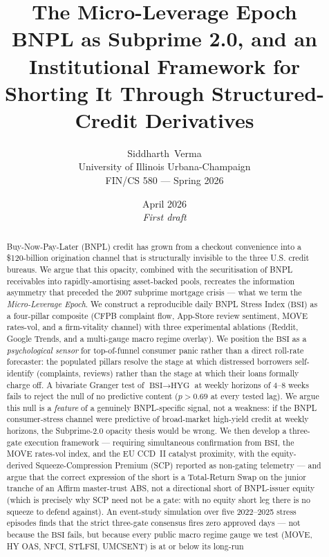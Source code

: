 \documentclass[11pt,letterpaper]{article}
\title{\vspace{-2em}
\Huge\bfseries The Micro-Leverage Epoch \\[0.2em]
\Large BNPL as Subprime 2.0, and an Institutional Framework for Shorting
It Through Structured-Credit Derivatives}
\author{
Siddharth~Verma \\[0.3em]
\small University of Illinois Urbana-Champaign \\
\small FIN/CS 580 --- Spring 2026}
\date{April 2026 \\ \small\textit{First draft}}
\newcommand{\bsi}{\text{BSI}}
\begin{document}
\maketitle
\thispagestyle{empty}

\begin{abstract}
\noindent
Buy-Now-Pay-Later (BNPL) credit has grown from a checkout convenience into a
\$120-billion origination channel that is structurally invisible to the three
U.S. credit bureaus. We argue that this opacity, combined with the securitisation
of BNPL receivables into rapidly-amortising asset-backed pools, recreates the
information asymmetry that preceded the 2007 subprime mortgage crisis --- what
we term the \emph{Micro-Leverage Epoch}. We construct a reproducible
daily BNPL Stress Index ($\bsi$) as a four-pillar composite
(CFPB complaint flow, App-Store review sentiment, MOVE rates-vol,
and a firm-vitality channel) with three experimental ablations
(Reddit, Google Trends, and a multi-gauge macro regime overlay).
We position the $\bsi$ as a \emph{psychological sensor} for
top-of-funnel consumer panic rather than a direct roll-rate
forecaster: the populated pillars resolve the stage at which
distressed borrowers self-identify (complaints, reviews) rather
than the stage at which their loans formally charge off.
A bivariate Granger test of $\bsi \rightarrow \text{HYG}$ at
weekly horizons of 4--8 weeks fails to reject the null of no
predictive content ($p > 0.69$ at every tested lag). We argue
this null is a \emph{feature} of a genuinely BNPL-specific
signal, not a weakness: if the BNPL consumer-stress channel were
predictive of broad-market high-yield credit at weekly horizons,
the Subprime-2.0 opacity thesis would be wrong. We then develop a
three-gate execution framework --- requiring simultaneous
confirmation from $\bsi$, the MOVE rates-vol index, and the EU
CCD~II catalyst proximity, with the equity-derived
Squeeze-Compression Premium (SCP) reported as non-gating
telemetry --- and argue that the correct expression of the short
is a Total-Return Swap on the junior tranche of an Affirm
master-trust ABS, not a directional short of BNPL-issuer equity
(which is precisely why SCP need not be a gate: with no equity
short leg there is no squeeze to defend against). An
event-study simulation over five 2022--2025 stress episodes finds
that the strict three-gate consensus fires zero approved days --- not because the
$\bsi$ fails, but because every public macro regime gauge we test
(MOVE, HY OAS, NFCI, STLFSI, UMCSENT) is at or below its long-run

\end{abstract}
\end{document}
